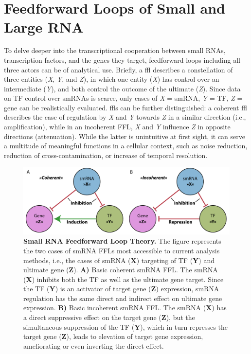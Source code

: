 \section{Feedforward Loops of Small and Large RNA} \label{sec:stroke:ffl}
To delve deeper into the transcriptional cooperation between small RNAs, transcription factors, and the genes they target, feedforward loops including all three actors can be of analytical use. Briefly, a \acf{ffl} describes a constellation of three entities (\emph{X}, \emph{Y}, and \emph{Z}), in which one entity (\emph{X}) has control over an intermediate (\emph{Y}), and both control the outcome of the ultimate (\emph{Z}).\cite{Reeves2019} Since data on TF control over smRNAs is scarce, only cases of \emph{X} = smRNA, \emph{Y} = TF, \emph{Z} = gene can be realistically evaluated. \Acp{ffl} can be further distinguished: a coherent \ac{ffl} describes the case of regulation by \emph{X} and \emph{Y} towards \emph{Z} in a similar direction (i.e., amplification), while in an incoherent FFL, \emph{X} and \emph{Y} influence \emph{Z} in opposite directions (attenuation). While the latter is unintuitive at first sight, it can serve a multitude of meaningful functions in a cellular context, such as noise reduction, reduction of cross-contamination, or increase of temporal resolution.\cite{Lai2016}

\begin{figure}[hb]
\includegraphics[width=\textwidth]{figures/ffl-theory}
\caption[Small RNA Feedforward Loop Theory.]{\textbf{Small RNA Feedforward Loop Theory.} The figure represents the two cases of smRNA FFLs most accessible to current analysis methods, i.e., the cases of smRNA (\textbf{X}) targeting of TF (\textbf{Y}) and ultimate gene (\textbf{Z}).  \textbf{A)} Basic coherent smRNA FFL. The smRNA (\textbf{X}) inhibits both the TF as well as the ultimate gene target. Since the TF (\textbf{Y}) is an activator of target gene (\textbf{Z}) expression, smRNA regulation has the same direct and indirect effect on ultimate gene expression. \textbf{B)} Basic incoherent smRNA FFL. The smRNA (\textbf{X}) has a direct suppressive effect on the target gene (\textbf{Z}), but the simultaneous suppression of the TF (\textbf{Y}), which in turn represses the target gene (\textbf{Z}), leads to elevation of target gene expression, ameliorating or even inverting the direct effect.
\label{fig:ffl-theory}}
\end{figure}


